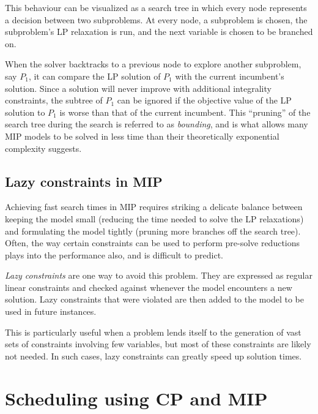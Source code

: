 \documentclass[13pt, letterpaper, oneside]{book}
\begin{document}
This behaviour can be visualized as a search tree in which every node represents
a decision between two subproblems. At every node, a subproblem is chosen, the
subproblem's LP relaxation is run, and the next variable is chosen to be
branched on.

When the solver backtracks to a previous node to explore another subproblem, say
$P_1$, it can compare the LP solution of $P_1$ with the current incumbent's
solution. Since a solution will never improve with additional integrality
constraints, the subtree of $P_1$ can be ignored if the objective value of the
LP solution to $P_1$ is worse than that of the current incumbent. This
``pruning'' of the search tree during the search is referred to as
\textit{bounding}, and is what allows many MIP models to be solved in less time than
their theoretically exponential complexity suggests.

\subsection{Lazy constraints in MIP}\label{sec:lazyconstraints}
Achieving fast search times in MIP requires striking a delicate balance between
keeping the model small (reducing the time needed to solve the LP relaxations)
and formulating the model tightly (pruning more branches off the search tree).
Often, the way certain constraints can be used to perform pre-solve reductions
plays into the performance also, and is difficult to predict.

\textit{Lazy constraints} are one way to avoid this problem. They are expressed
as regular linear constraints and checked against whenever the model encounters
a new solution. Lazy constraints that were violated are then added to the model
to be used in future instances.

This is particularly useful when a problem lends itself to the generation of
vast sets of constraints involving few variables, but most of these constraints
are likely not needed. In such cases, lazy constraints can greatly speed up
solution times.

\section{Scheduling using CP and MIP}
\end{document}
